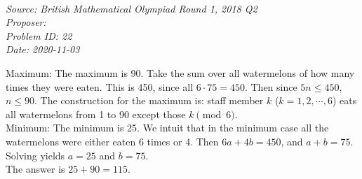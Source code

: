 \SSbreak\\
\emph{Source: British Mathematical Olympiad Round 1, 2018 Q2}\\
\emph{Proposer: \Pss}\\
\emph{Problem ID: 22}\\
\emph{Date: 2020-11-03}\\
\SSbreak

\bigskip

\begin{solution}\hfil\medskip

    Maximum: The maximum is 90. Take the sum over all watermelons of how many times they were eaten. This is 450, since all $6 \cdot 75 = 450$. Then since $5n \leq 450$, $n \leq 90$. The construction for the maximum is: staff member $k$ ($k = 1, 2, \cdots, 6$) eats all watermelons from 1 to 90 except those $k \pmod6$. \\

    Minimum: The minimum is 25. We intuit that in the minimum case all the watermelons were either eaten 6 times or 4. Then $6a + 4b = 450$, and $a + b = 75$. Solving yields $a = 25$ and $b = 75$. \\

    The answer is $25 + 90 = \boxed{115}$. 
\end{solution}\bigskip
